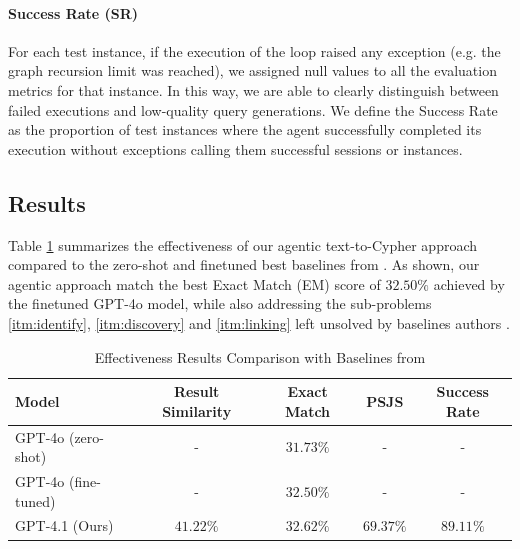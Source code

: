 \paragraph{Success Rate (SR)} For each test instance, if the execution of the loop raised any exception (e.g. the graph recursion limit was reached), we assigned null values to all the evaluation metrics for that instance. In this way, we are able to clearly distinguish between failed executions and low-quality query generations. We define the Success Rate as the proportion of test instances where the agent successfully completed its execution without exceptions calling them successful sessions or instances.

\subsection{Results}

Table \ref{tab:effectiveness-results-comparison} summarizes the effectiveness of our agentic text-to-Cypher approach compared to the zero-shot and finetuned best baselines from \cite{neo4jlabs-text2cypher-2024}. As shown, our agentic approach match the best Exact Match (EM) score of $32.50\%$ achieved by the finetuned GPT-4o model, while also addressing the sub-problems \ref{itm:identify}, \ref{itm:discovery} and \ref{itm:linking} left unsolved by baselines authors \cite{neo4jlabs-text2cypher-2024}.

\begin{table}[htbp]
    \centering
    \begin{tabular}{lcccc}
        \hline
        Model & Result Similarity & Exact Match & PSJS & Success Rate \\
        \hline
        GPT-4o (zero-shot) & - & $31.73\%$ & - & - \\
        GPT-4o (fine-tuned) & - & $32.50\%$ & - & - \\
        GPT-4.1 (Ours)  & $41.22\%$ & $32.62\% $ & $69.37\%$ & $89.11\%$ \\
        \hline
    \end{tabular}
    \caption{Effectiveness Results Comparison with Baselines from \cite{neo4jlabs-text2cypher-2024}}
    \label{tab:effectiveness-results-comparison}
\end{table}



